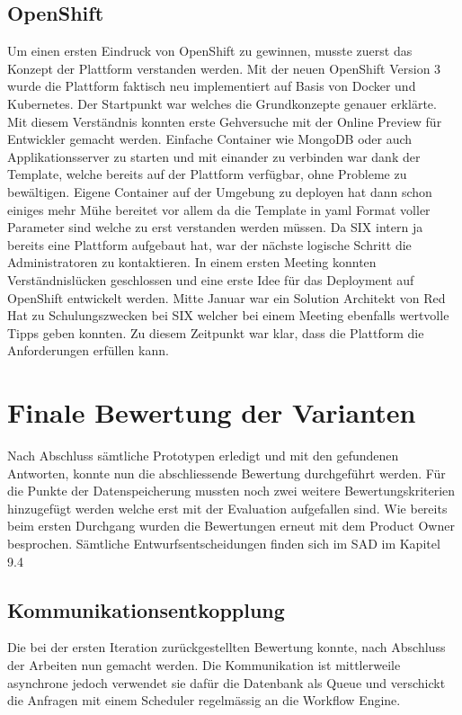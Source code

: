 \subsection{OpenShift}

Um einen ersten Eindruck von OpenShift zu gewinnen, musste zuerst das Konzept der Plattform verstanden werden. Mit der neuen OpenShift Version 3 wurde die Plattform faktisch neu implementiert auf Basis von Docker und Kubernetes. Der Startpunkt war \cite{openshiftintro} welches die Grundkonzepte genauer erklärte. Mit diesem Verständnis konnten erste Gehversuche mit der Online Preview für Entwickler gemacht werden. Einfache Container wie MongoDB oder auch Applikationsserver zu starten und mit einander zu verbinden war dank der Template, welche bereits auf der Plattform verfügbar, ohne Probleme zu bewältigen. Eigene Container auf der Umgebung zu deployen hat dann schon einiges mehr Mühe bereitet vor allem da die Template in yaml Format voller Parameter sind welche zu erst verstanden werden müssen. Da SIX intern ja bereits eine Plattform aufgebaut hat, war der nächste logische Schritt die Administratoren zu kontaktieren. In einem ersten Meeting konnten Verständnislücken geschlossen und eine erste Idee für das Deployment auf OpenShift entwickelt werden. Mitte Januar war ein Solution Architekt von Red Hat zu Schulungszwecken bei SIX welcher bei einem Meeting ebenfalls wertvolle Tipps geben konnten. Zu diesem Zeitpunkt war klar, dass die Plattform die Anforderungen erfüllen kann.
\newpage

\section{Finale Bewertung der Varianten}

Nach Abschluss sämtliche Prototypen erledigt und mit den gefundenen Antworten, konnte nun die abschliessende Bewertung durchgeführt werden. Für die Punkte der Datenspeicherung mussten noch zwei weitere Bewertungskriterien hinzugefügt werden welche erst mit der Evaluation aufgefallen sind. Wie bereits beim ersten Durchgang wurden die Bewertungen erneut mit dem Product Owner besprochen. Sämtliche Entwurfsentscheidungen finden sich im SAD im Kapitel 9.4

\subsection{Kommunikationsentkopplung}

Die bei der ersten Iteration zurückgestellten Bewertung konnte, nach Abschluss der Arbeiten nun gemacht werden. Die Kommunikation ist mittlerweile asynchrone jedoch verwendet sie dafür die Datenbank als Queue und verschickt die Anfragen mit einem Scheduler regelmässig an die Workflow Engine.

